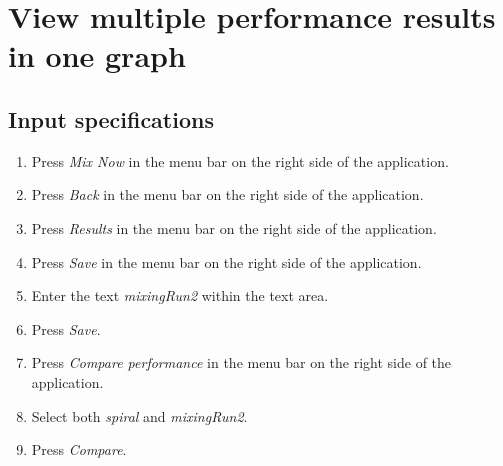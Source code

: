 \section{View multiple performance results in one graph}

\subsection*{Input specifications}
\begin{enumerate}
\item Press \emph{Mix Now} in the menu bar on the right side of the application.
\item Press \emph{Back} in the menu bar on the right side of the application.
\item Press \emph{Results} in the menu bar on the right side of the application.
\item Press \emph{Save} in the menu bar on the right side of the application.
\item Enter the text \emph{mixingRun2} within the text area.
\item Press \emph{Save}.
\item Press \emph{Compare performance} in the menu bar on the right side of the application.
\item Select both \emph{spiral} and \emph{mixingRun2}.
\item Press \emph{Compare}.
\end{enumerate}

